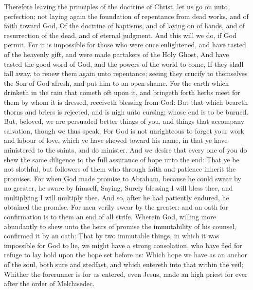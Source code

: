  Therefore leaving the principles of the doctrine of
Christ, let us go on unto perfection; not laying again the foundation of
repentance from dead works, and of faith toward God,  Of
the doctrine of baptisms, and of laying on of hands, and of resurrection
of the dead, and of eternal judgment.  And this will we
do, if God permit.  For it is impossible for those who
were once enlightened, and have tasted of the heavenly gift, and were
made partakers of the Holy Ghost,  And have tasted the
good word of God, and the powers of the world to come,  If
they shall fall away, to renew them again unto repentance; seeing they
crucify to themselves the Son of God afresh, and put him to an open
shame.  For the earth which drinketh in the rain that
cometh oft upon it, and bringeth forth herbs meet for them by whom it is
dressed, receiveth blessing from God:  But that which
beareth thorns and briers is rejected, and is nigh unto cursing; whose
end is to be burned.  But, beloved, we are persuaded
better things of you, and things that accompany salvation, though we
thus speak.  For God is not unrighteous to forget your
work and labour of love, which ye have shewed toward his name, in that
ye have ministered to the saints, and do minister.  And
we desire that every one of you do shew the same diligence to the full
assurance of hope unto the end:  That ye be not slothful,
but followers of them who through faith and patience inherit the
promises.  For when God made promise to Abraham, because
he could swear by no greater, he sware by himself, 
Saying, Surely blessing I will bless thee, and multiplying I will
multiply thee.  And so, after he had patiently endured,
he obtained the promise.  For men verily swear by the
greater: and an oath for confirmation is to them an end of all strife.
 Wherein God, willing more abundantly to shew unto the
heirs of promise the immutability of his counsel, confirmed it by an
oath:  That by two immutable things, in which it was
impossible for God to lie, we might have a strong consolation, who have
fled for refuge to lay hold upon the hope set before us: 
Which hope we have as an anchor of the soul, both sure and stedfast, and
which entereth into that within the veil;  Whither the
forerunner is for us entered, even Jesus, made an high priest for ever
after the order of Melchisedec.

